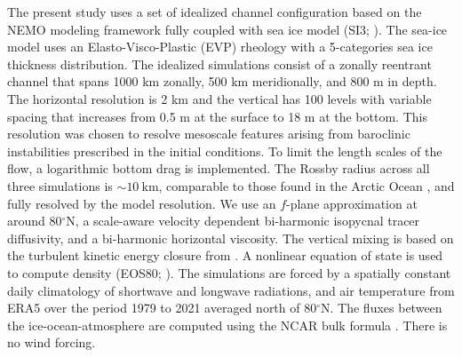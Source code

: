 \documentclass[draft]{agujournal2019}
\begin{document}
The present study uses a set of idealized channel configuration based on the NEMO modeling framework \citep{NEMO_man} fully coupled with sea ice model (SI3; \citealp*{SI3_man}). The sea-ice model uses an Elasto-Visco-Plastic (EVP) rheology with a 5-categories sea ice thickness distribution. The idealized simulations consist of a zonally reentrant channel that spans 1000 km zonally, 500 km meridionally, and 800 m in depth. The horizontal resolution is 2 km and the vertical has 100 levels with variable spacing that increases from 0.5 m at the surface to 18 m at the bottom. This resolution was chosen to resolve mesoscale features arising from baroclinic instabilities prescribed in the initial conditions. To limit the length scales of the flow, a logarithmic bottom drag is implemented. The Rossby radius across all three simulations is $\sim 10\ \mathrm{km}$, comparable to those found in the Arctic Ocean \citep{Nurser_rossby_2014}, and fully resolved by the model resolution. We use an $f$-plane approximation at around 80$^\circ$N, a scale-aware velocity dependent bi-harmonic isopycnal tracer diffusivity, and a bi-harmonic horizontal viscosity. The vertical mixing is based on the turbulent kinetic energy closure from \citet{blanke_TKE_1993}. A nonlinear equation of state is used to compute density (EOS80; \citealt{EOS_80}). The simulations are forced by a spatially constant daily climatology of shortwave and longwave radiations, and air temperature from ERA5 over the period 1979 to 2021 averaged north of 80$\mathrm{^\circ N}$. The fluxes between the ice-ocean-atmosphere are computed using the NCAR bulk formula \citep{Large_global_2009}. There is no wind forcing. 
\end{document}
